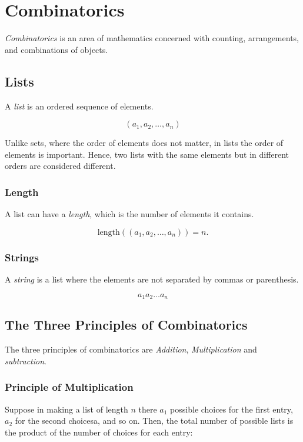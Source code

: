 \chapter{Combinatorics}

\emph{Combinatorics} is an area of mathematics concerned with counting, arrangements, and combinations of objects.

\section{Lists}

A \emph{list} is an ordered sequence of elements.

\[
	(a_1, a_2, \dots, a_n)
\]

Unlike sets, where the order of elements does not matter, in lists the order of elements is important. Hence, two
lists with the same elements but in different orders are considered different.

\subsection{Length}

A list can have a \emph{length}, which is the number of elements it contains.

\[
	\text{length}((a_1, a_2, \dots, a_n)) = n.
\]

\subsection{Strings}

A \emph{string} is a list where the elements are not separated by commas or parenthesis.

\[
	a_1 a_2 \dots a_n
\]

\section{The Three Principles of Combinatorics}

The three principles of combinatorics are \emph{Addition}, \emph{Multiplication} and \emph{subtraction}.

\subsection{Principle of Multiplication}

Suppose in making a list of length \(n\) there \(a_1\) possible choices for the first entry, \(a_2\) for the second choicesa, and
so on. Then, the total number of possible lists is the product of the number of choices for each entry:


